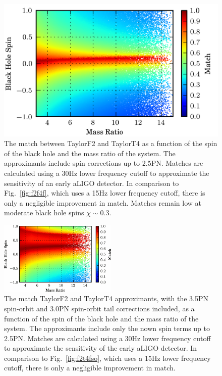 \begin{figure}
\begin{center}
\includegraphics{papers/nsbh_faithfulness/figure15.png}
\end{center}
\caption{\label{fig:5f2t430}The match between TaylorF2 and
TaylorT4 as a function of the spin of the black hole
and the mass ratio of the system. The approximants include spin corrections up to 2.5\ac{PN}. 
Matches are calculated using a 30Hz lower frequency cutoff to
approximate the sensitivity of an early \ac{aLIGO} detector. In comparison to Fig.~\ref{fig:f2f4f}, which uses a 15Hz lower
frequency cutoff, there is only a negligible improvement in match. Matches remain low at moderate black hole spins
$\chi \sim 0.3$.}
\end{figure}

\begin{figure}
\begin{center}
\includegraphics[width=0.5\textwidth]{papers/nsbh_faithfulness/figure16.png}
\end{center}
\caption{\label{fig:7f2t430}The match TaylorF2 and
TaylorT4 approximants, with the 3.5\ac{PN} spin-orbit and 3.0\ac{PN} spin-orbit tail corrections
included, as a function of the spin of the black hole
and the mass ratio of the system.  The approximants include only the nown
spin terms up to 2.5\ac{PN}. Matches are calculated using a 30Hz lower frequency cutoff to
approximate the sensitivity of the early \ac{aLIGO} detector. In comparison to Fig.~\ref{fig:f2t4fso}, which uses a 15Hz lower
frequency cutoff, there is only a negligible improvement in match. }
\end{figure}

